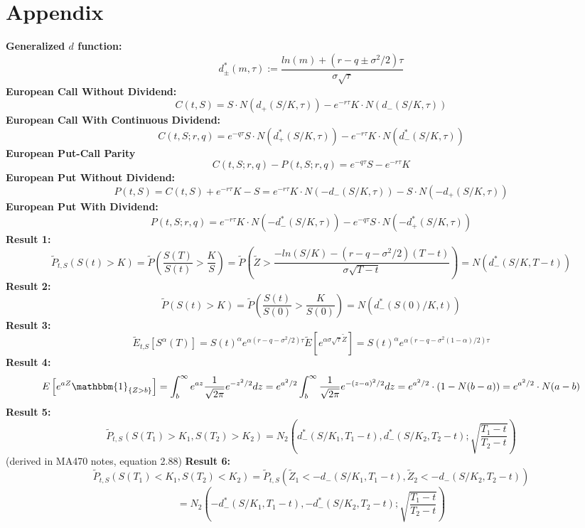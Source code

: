 \documentclass{article}[12pt,a4paper]
\begin{document}
  \section*{Appendix}
  \textbf{Generalized $d$ function:}
  $$d_{\pm}^{*}(m,\tau) := \frac{ln(m) + (r - q \pm \sigma^2/2)\tau}{\sigma\sqrt\tau}$$
  \newline \textbf{European Call Without Dividend:} 
  $$C(t, S) = S\cdot N(d_+(S/K,\tau)) - e^{-r\tau}K\cdot N(d_-(S/K, \tau))$$
  \newline \textbf{European Call With Continuous Dividend:} 
  $$C(t, S ; r, q) = e^{-q\tau}S\cdot N(d^*_+(S/K, \tau)) - e^{-r\tau}K\cdot N(d^*_-(S/K,\tau))$$
  \newline \textbf{European Put-Call Parity}
  $$C(t,S;r,q) - P(t,S;r,q) = e^{-q\tau}S - e^{-r\tau}K$$
  \newline \textbf{European Put Without Dividend:}
  $$P(t, S) = C(t, S) + e^{-r\tau}K - S = e^{-r\tau}K\cdot N(-d_-(S/K,\tau)) - S\cdot N(-d_+(S/K,\tau))$$
  \newline \textbf{European Put With Dividend:}
  $$P(t, S; r, q) = e^{-r\tau}K\cdot N(-d^*_-(S/K,\tau)) - 
  	e^{-q\tau}S\cdot N(-d^*_+(S/K,\tau))$$
  \newline\textbf{Result 1:}
  $$\widetilde{P}_{t, S}(S(t) > K) = \widetilde{P}(\frac{S(T)}{S(t)} > \frac{K}{S}) = 
  \widetilde{P}(\widetilde{Z} > \frac{-ln(S/K) - (r - q - \sigma^2/2)(T - t)}{\sigma\sqrt{T - t}}) = N(d^*_-(S/K,T - t))$$ \newline
  \textbf{Result 2:}
  $$\widetilde{P}(S(t) > K) = \widetilde{P}(\frac{S(t)}{S(0)} > \frac{K}{S(0)}) = N(d_-^*(S(0)/K,t))$$ \newline
  \textbf{Result 3:}
  $$\widetilde{E}_{t\mbox{,}S}\left[ S^{\alpha}(T) \right] = 
   S(t)^\alpha e^{\alpha(r - q - \sigma^2/2)\tau} \widetilde{E}\left[ e^{\alpha \sigma \sqrt\tau \widetilde{Z}}\right] =
    S(t)^\alpha e^{\alpha(r - q - \sigma^2(1  - \alpha)/2 )\tau}$$ 
    \newline \textbf{Result 4:}
    $$
    E \left[ e^{aZ} \mathbbm{1}_{\{ Z > b \}} \right] = 
    \int_b^{\infty} { e^{az} \frac{1}{\sqrt{2\pi}} e^{-z^2/2} dz} = 
    e^{a^2/2}\int_{b}^{\infty}{\frac{1}{\sqrt{2\pi}}  e^{-(z - a)^2/2} dz} = 
    e^{a^2/2} \cdot (1 - N(b - a)) = e^{a^2/2} \cdot N(a - b)$$
    \textbf{Result 5:}
    $$\widetilde{P}_{t, S}(S(T_1) > K_1, S(T_2) > K_2) = N_2(d_-^*(S/K_1, T_1 - t), 
    		d_-^*(S/K_2, T_2 - t);\sqrt{\frac{T_1 - t}{T_2 - t}})$$
    \hfill (derived in MA470 notes, equation 2.88) \newline
    \textbf{Result 6:}
     $$\widetilde{P}_{t, S}(S(T_1) < K_1, S(T_2) < K_2) =
     \widetilde{P}_{t, S}(\widetilde{Z}_1 < -d_-(S/K_1, T_1 - t), \widetilde{Z}_2 < -d_-(S/K_2, T_2 - t))$$
     $$ = N_2(-d_-^*(S/K_1, T_1 - t), -d_-^*(S/K_2, T_2 - t);\sqrt{\frac{T_1 - t}{T_2 - t}})$$
     \pagebreak
     
\end{document}
